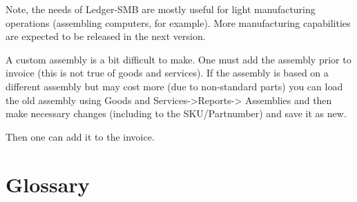 \documentclass{article}
\begin{document}
Note, the needs of Ledger-SMB are mostly useful for light manufacturing 
operations (assembling computers, for example).  More manufacturing capabilities
are expected to be released in the next version.

A custom assembly is a bit difficult to make.  One must add the assembly prior
to invoice (this is not true of goods and services).  If the assembly is based
on a different assembly but may cost more (due to non-standard parts) you can
load the old assembly using Goods and Services-\textgreater Reports-\textgreater
Assemblies and then make necessary changes (including to the SKU/Partnumber) and
save it as new.

Then one can add it to the invoice.

\section{Glossary}
\end{document}
